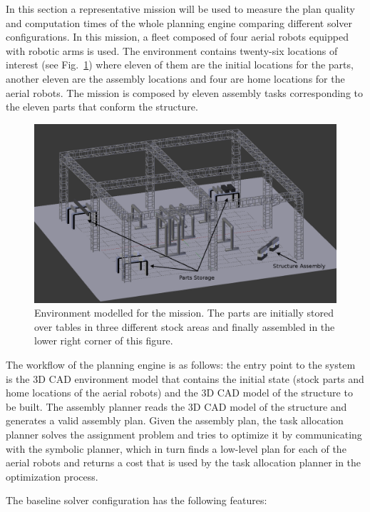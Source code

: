 \documentclass[runningheads,a4paper]{llncs}
\begin{document}
In this section a representative mission will be used to measure the plan quality and computation times of the whole planning engine comparing different solver configurations. In this mission, a fleet composed of four aerial robots equipped with robotic arms is used. The environment contains twenty-six locations of interest (see Fig.~\ref{fig:environment}) where eleven of them are the initial locations for the parts, another eleven are the assembly locations and four are home locations for the aerial robots. The mission is composed by eleven assembly tasks corresponding to the eleven parts that conform the structure. 

\begin{figure}
    \centering
    \includegraphics[width=0.75\columnwidth]{final_scene.png}
    \caption[Environment modelled for the mission.]{Environment modelled for the mission. The parts are initially stored over tables in three different stock areas and finally assembled in the lower right corner of this figure.}
    \label{fig:environment}
\end{figure}

The workflow of the planning engine is as follows: the entry point to the system is the 3D CAD environment model that contains the initial state (stock parts and home locations of the aerial robots) and the 3D CAD model of the structure to be built. The assembly planner reads the 3D CAD model of the structure and generates a valid assembly plan. Given the assembly plan, the task allocation planner solves the assignment problem and tries to optimize it by communicating with the symbolic planner, which in turn finds a low-level plan for each of the aerial robots and returns a cost that is used by the task allocation planner in the optimization process.

The baseline solver configuration has the following features:
\end{document}
